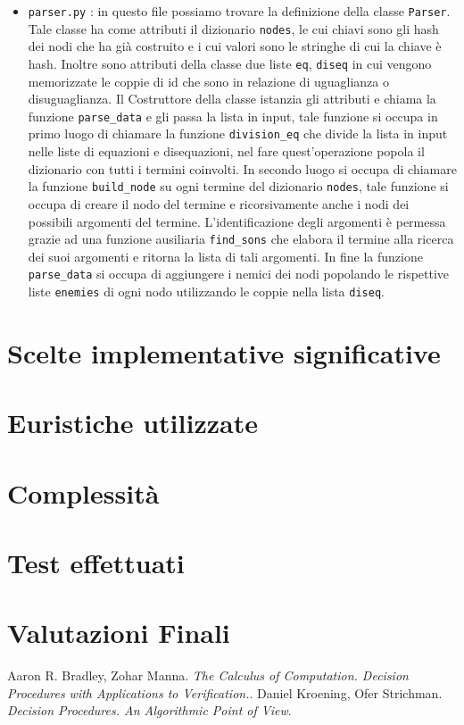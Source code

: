 \documentclass[a4paper, 11pt]{article}
\begin{document}
\begin{itemize}
\item \verb|parser.py| : in questo file possiamo trovare la definizione della classe \verb|Parser|. Tale classe ha come attributi il dizionario \verb|nodes|, le cui chiavi sono gli hash dei nodi che ha già costruito e i cui valori sono le stringhe di cui la chiave è hash. Inoltre sono attributi della classe due liste \verb|eq|, \verb|diseq| in cui vengono memorizzate le coppie di id che sono in relazione di uguaglianza o disuguaglianza. Il Costruttore della classe istanzia gli attributi e chiama la funzione \verb|parse_data| e gli passa la lista in input, tale funzione si occupa in primo luogo di chiamare la funzione \verb|division_eq| che divide la lista in input nelle liste di equazioni e disequazioni, nel fare quest'operazione popola il dizionario con tutti i termini coinvolti. In secondo luogo si occupa di chiamare la funzione \verb|build_node| su ogni termine del dizionario \verb|nodes|, tale funzione si occupa di creare il nodo del termine e ricorsivamente anche i nodi dei possibili argomenti del termine. L'identificazione degli argomenti è permessa grazie ad una funzione ausiliaria \verb|find_sons| che elabora il termine alla ricerca dei suoi argomenti e ritorna la lista di tali argomenti. In fine la funzione \verb|parse_data| si occupa di aggiungere i nemici dei nodi popolando le rispettive liste \verb|enemies| di ogni nodo utilizzando le coppie nella lista \verb|diseq|.

\end{itemize}
\section*{Scelte implementative significative}

\section*{Euristiche utilizzate}

\section*{Complessità}

\section*{Test effettuati}

\section*{Valutazioni Finali}

\begin{thebibliography}{2}
 Aaron R. Bradley, Zohar Manna. \emph{The Calculus of Computation. Decision Procedures with Applications to Verification.}.
  Daniel Kroening, Ofer Strichman. \emph{Decision Procedures. An Algorithmic Point of View}.
\end{thebibliography}
\end{document}
